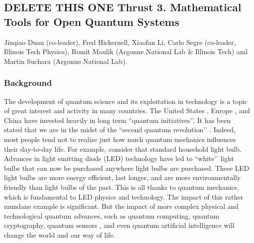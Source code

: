 \documentclass[11pt]{NSFamsart}
\begin{document}


\iffalse
\subsection*{\color{magenta}DELETE THIS ONE Thrust 3. Mathematical Tools for Open Quantum Systems}
Jinqiao Duan (co-leader), Fred Hickernell, Xiaofan Li,  Carlo Segre (co-leader, Illinois Tech Physics), Romit Maulik (Argonne National Lab \& Illinois Tech) and Martin Suchara (Argonne National Lab).

\subsubsection*{Background} The development of quantum science and its exploitation in technology is a topic of great interest and activity in many countries. The United States \cite{raymer2019us}, Europe \cite{riedel2019europe}, and China \cite{kania2018quantum} have invested heavily in long term ``quantum initiatives’’.  It has been stated that we are in the midst of the ``second quantum revolution’’ \cite{kania2018quantum}. Indeed,  most people tend not to realize just how much quantum mechanics influences their day-to-day life. For example, consider that standard household light bulb. Advances in light emitting diode (LED) technology have led to ``white’’ light bulbs that can now be purchased anywhere light bulbs are purchased. These LED light bulbs are more energy efficient, last longer, and are more environmentally friendly than light bulbs of the past. This is all thanks to quantum mechanics, which is fundamental to LED physics and technology. The impact of this rather mundane example is significant. But the impact of more complex physical and technological quantum advances, such as quantum computing, quantum cryptography, quantum sensors \cite{ng2020guest}, and even quantum artificial intelligence \cite{taylor2020quantum} will change the world and our way of life.
\end{document}
